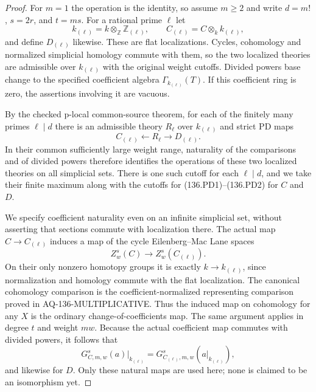 \begin{proof}
For $m=1$ the operation is the identity, so assume
$m\ge2$ and write $d=m!$, $s=2r$, and $t=ms$.
For a rational prime $\ell$ let
\[
       k_{(\ell)}=k\otimes_{\mathbb Z}\mathbb Z_{(\ell)},
       \qquad C_{(\ell)}=C\otimes_k k_{(\ell)},
                                                               \tag{136.PR2}
\]
and define $D_{(\ell)}$ likewise. These are flat
localizations. Cycles, cohomology and normalized
simplicial homology commute with them, so the two
localized theories are admissible over $k_{(\ell)}$
with the original weight cutoffs. Divided powers
base change to the specified coefficient algebra
$\Gamma_{k_{(\ell)}}(T)$. If this coefficient ring
is zero, the assertions involving it are vacuous.

By the checked p-local common-source theorem, for
each of the finitely many primes $\ell\mid d$ there
is an admissible theory $R_\ell$ over $k_{(\ell)}$
and strict PD maps
\[
                    C_{(\ell)}\longleftarrow R_\ell
                                      \longrightarrow D_{(\ell)}.
                                                               \tag{136.PR3}
\]
In their common sufficiently large weight range,
naturality of the comparisons and of divided powers
therefore identifies the operations of these two
localized theories on all simplicial sets. There
is one such cutoff for each $\ell\mid d$, and we
take their finite maximum along with the cutoffs
for (136.PD1)--(136.PD2) for $C$ and $D$.

We specify coefficient naturality even on an infinite
simplicial set, without asserting that sections
commute with localization there. The actual map
$C\to C_{(\ell)}$ induces a map of the cycle
Eilenberg--Mac Lane spaces
\[
          Z^s_w(C)\longrightarrow Z^s_w(C_{(\ell)}).
\]
On their only nonzero homotopy groups it is exactly
$k\to k_{(\ell)}$, since normalization and homology
commute with the flat localization. The canonical
cohomology comparison is the coefficient-normalized
representing comparison proved in AQ-136-MULTIPLICATIVE.
Thus the induced map on cohomology for any $X$ is
the ordinary change-of-coefficients map. The same
argument applies in degree $t$ and weight $mw$.
Because the actual coefficient map commutes with
divided powers, it follows that
\[
 G_{C,m,w}^{s}(a)\big|_{k_{(\ell)}}
       =G_{C_{(\ell)},m,w}^{s}
                             (a\big|_{k_{(\ell)}}),
                                                               \tag{136.PR4}
\]
and likewise for $D$. Only these natural maps are
used here; none is claimed to be an isomorphism yet.


\end{proof}

